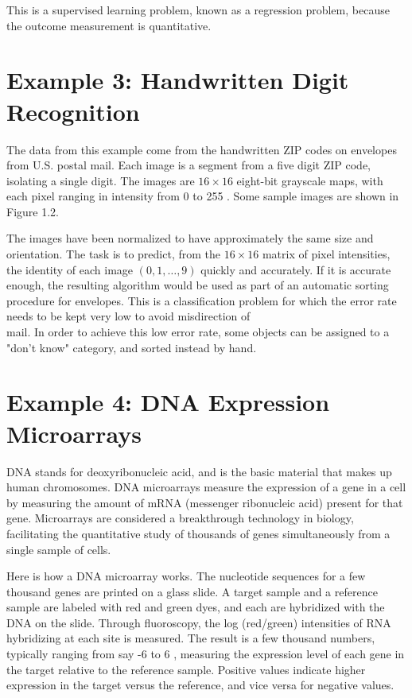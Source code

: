 \documentclass[10pt]{article}
\begin{document}
This is a supervised learning problem, known as a regression problem, because the outcome measurement is quantitative.

\section*{Example 3: Handwritten Digit Recognition}
The data from this example come from the handwritten ZIP codes on envelopes from U.S. postal mail. Each image is a segment from a five digit ZIP code, isolating a single digit. The images are $16 \times 16$ eight-bit grayscale maps, with each pixel ranging in intensity from 0 to 255 . Some sample images are shown in Figure 1.2.

The images have been normalized to have approximately the same size and orientation. The task is to predict, from the $16 \times 16$ matrix of pixel intensities, the identity of each image $(0,1, \ldots, 9)$ quickly and accurately. If it is accurate enough, the resulting algorithm would be used as part of an automatic sorting procedure for envelopes. This is a classification problem for which the error rate needs to be kept very low to avoid misdirection of\\
mail. In order to achieve this low error rate, some objects can be assigned to a "don't know" category, and sorted instead by hand.

\section*{Example 4: DNA Expression Microarrays}
DNA stands for deoxyribonucleic acid, and is the basic material that makes up human chromosomes. DNA microarrays measure the expression of a gene in a cell by measuring the amount of mRNA (messenger ribonucleic acid) present for that gene. Microarrays are considered a breakthrough technology in biology, facilitating the quantitative study of thousands of genes simultaneously from a single sample of cells.

Here is how a DNA microarray works. The nucleotide sequences for a few thousand genes are printed on a glass slide. A target sample and a reference sample are labeled with red and green dyes, and each are hybridized with the DNA on the slide. Through fluoroscopy, the log (red/green) intensities of RNA hybridizing at each site is measured. The result is a few thousand numbers, typically ranging from say -6 to 6 , measuring the expression level of each gene in the target relative to the reference sample. Positive values indicate higher expression in the target versus the reference, and vice versa for negative values.
\end{document}

